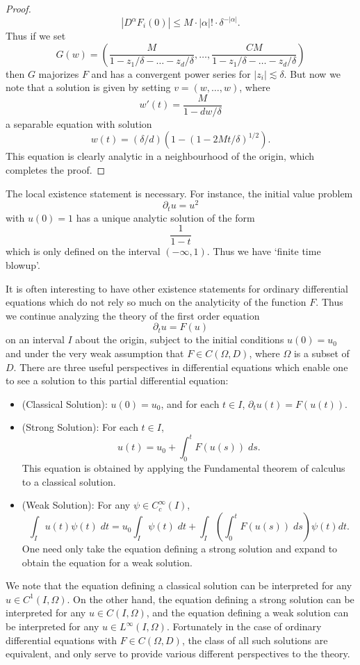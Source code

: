 \begin{proof}
    \[ |D^\alpha F_i(0)| \leq M \cdot |\alpha|! \cdot \delta^{-|\alpha|}. \]
    Thus if we set
    \[ G(w) = \left( \frac{M}{1 - z_1/\delta - \dots - z_d/\delta}, \dots, \frac{CM}{1 - z_1/\delta - \dots - z_d/\delta} \right) \]
    then $G$ majorizes $F$ and has a convergent power series for $|z_i| \lesssim \delta$. But now we note that a solution is given by setting $v = (w,\dots,w)$, where
    \[ w'(t) = \frac{M}{1 - dw/\delta} \]
    a separable equation with solution
    \[ w(t) = (\delta/d)(1 - (1 - 2Mt/\delta)^{1/2}). \]
    This equation is clearly analytic in a neighbourhood of the origin, which completes the proof.
\end{proof}

\begin{remark}
    The local existence statement is necessary. For instance, the initial value problem
    \[ \partial_t u = u^2 \]
    with $u(0) = 1$ has a unique analytic solution of the form
    \[ \frac{1}{1 - t} \]
    which is only defined on the interval $(-\infty,1)$. Thus we have `finite time blowup'.
\end{remark}

It is often interesting to have other existence statements for ordinary differential equations which do not rely so much on the analyticity of the function $F$. Thus we continue analyzing the theory of the first order equation
%
\[ \partial_t u = F(u) \]
%
on an interval $I$ about the origin, subject to the initial conditions $u(0) = u_0$ and under the very weak assumption that $F \in C(\Omega,D)$, where $\Omega$ is a subset of $D$. There are three useful perspectives in differential equations which enable one to see a solution to this partial differential equation:
%
\begin{itemize}
    \item (Classical Solution): $u(0) = u_0$, and for each $t \in I$, $\partial_t u(t) = F(u(t))$.
    \item (Strong Solution): For each $t \in I$,
    \[ u(t) = u_0 + \int_0^t F(u(s))\; ds. \]
    This equation is obtained by applying the Fundamental theorem of calculus to a classical solution.

    \item (Weak Solution): For any $\psi \in C_c^\infty(I)$,
    \[ \int_I u(t) \psi(t)\; dt = u_0 \int_I \psi(t)\; dt + \int_I \left( \int_0^t F(u(s))\; ds \right) \psi(t) dt. \]
    One need only take the equation defining a strong solution and expand to obtain the equation for a weak solution.
\end{itemize}
%
We note that the equation defining a classical solution can be interpreted for any $u \in C^1(I,\Omega)$. On the other hand, the equation defining a strong solution can be interpreted for any $u \in C(I,\Omega)$, and the equation defining a weak solution can be interpreted for any $u \in L^\infty(I,\Omega)$. Fortunately in the case of ordinary differential equations with $F \in C(\Omega,D)$, the class of all such solutions are equivalent, and only serve to provide various different perspectives to the theory.

